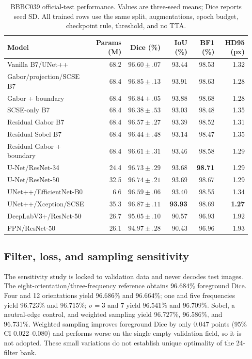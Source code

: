 \documentclass{article}
\begin{document}
\begin{table}[t]
\centering\small
\caption{BBBC039 official-test performance. Values are three-seed means; Dice reports seed SD. All trained rows use the same split, augmentations, epoch budget, checkpoint rule, threshold, and no TTA.}
\label{tab:bbbc}
\setlength{\tabcolsep}{5.0pt}
\begin{tabular}{@{}lrrrrr@{}}\toprule
Model & Params (M) & Dice (\%) & IoU (\%) & BF1 (\%) & HD95 (px)\\\midrule
Vanilla B7/UNet++ & 68.2 & $96.60\!\pm\!.07$ & 93.44 & 98.53 & 1.32\\
Gabor/projection/SCSE B7 & 68.4 & $96.85\!\pm\!.13$ & 93.91 & 98.63 & 1.28\\
Gabor + boundary & 68.4 & $96.84\!\pm\!.05$ & 93.88 & 98.68 & 1.28\\
SCSE-only B7 & 68.4 & $96.38\!\pm\!.53$ & 93.03 & 98.48 & 1.35\\
Residual Gabor B7 & 68.4 & $96.57\!\pm\!.27$ & 93.39 & 98.52 & 1.31\\
Residual Sobel B7 & 68.4 & $96.44\!\pm\!.48$ & 93.14 & 98.47 & 1.35\\
Residual Gabor + boundary & 68.4 & $96.61\!\pm\!.31$ & 93.46 & 98.58 & 1.29\\\midrule
U-Net/ResNet-34 & 24.4 & $96.73\!\pm\!.29$ & 93.68 & \textbf{98.71} & 1.29\\
U-Net/ResNet-50 & 32.5 & $96.74\!\pm\!.21$ & 93.69 & 98.67 & 1.29\\
UNet++/EfficientNet-B0 & 6.6 & $96.59\!\pm\!.06$ & 93.40 & 98.55 & 1.34\\
UNet++/Xception/SCSE & 35.3 & $\mathbf{96.87\!\pm\!.11}$ & \textbf{93.93} & 98.69 & \textbf{1.27}\\
DeepLabV3+/ResNet-50 & 26.7 & $95.05\!\pm\!.10$ & 90.57 & 96.93 & 1.92\\
FPN/ResNet-50 & 26.1 & $94.97\!\pm\!.28$ & 90.43 & 96.96 & 1.93\\\bottomrule
\end{tabular}
\end{table}

\subsection{Filter, loss, and sampling sensitivity}
The sensitivity study is locked to validation data and never decodes test images. The eight-orientation/three-frequency reference obtains 96.684\% foreground Dice. Four and 12 orientations yield 96.686\% and 96.664\%; one and five frequencies yield 96.723\% and 96.715\%; $\sigma=3$ and 7 yield 96.541\% and 96.709\%. Sobel, a neutral-edge control, and weighted sampling yield 96.727\%, 96.586\%, and 96.731\%. Weighted sampling improves foreground Dice by only 0.047 points (95\% CI 0.022--0.080) and performs worse on the single empty validation field, so it is not adopted. These small variations do not establish unique optimality of the 24-filter bank.
\end{document}
